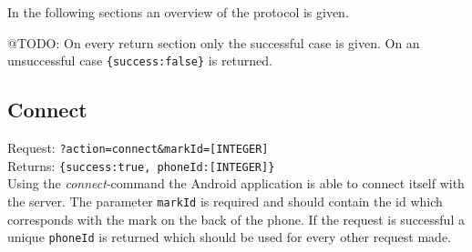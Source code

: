 \documentclass[a4paper,10pt]{article}
\begin{document}
In the following sections an overview of the protocol is given.

@TODO: On every return section only the successful case is given. On an unsuccessful case \texttt{\{success:false\}} is returned.

\subsection{Connect}
Request: \texttt{?action=connect\&markId=[INTEGER]} \\
Returns: \texttt{\{success:true, phoneId:[INTEGER]\}} \\

\noindent Using the \emph{connect}-command the Android application is able to connect itself with the server.
The parameter \texttt{markId} is required and should contain the id which corresponds with the mark on the back of the phone.
If the request is successful a unique \texttt{phoneId} is returned which should be used for every other request made.




\end{document}
